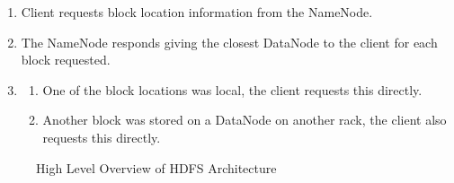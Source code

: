 \documentclass[conference]{IEEEtran}
\begin{document}
\begin{enumerate}
\item Client requests block location information from the NameNode.
\item The NameNode responds giving the closest DataNode to the client for each block requested.
	\item \begin{enumerate}
     \item One of the block locations was local, the client requests this directly.
     \item Another block was stored on a DataNode on another rack, the client also requests this directly.
   \end{enumerate}
\end{enumerate}


\begin{figure}[ht]
\centering
{}
\caption{High Level Overview of HDFS Architecture}
\label{clientread}
\end{figure}
\end{document}
